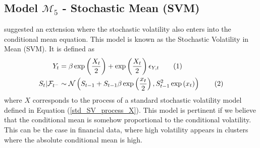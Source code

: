 \documentclass[11pt,a4,twosided,singlespacing,titlepagenumber=on]{scrreprt}
\numberwithin{equation}{chapter} %
\theoremstyle{remark}
\newcommand\numberthis{\addtocounter{equation}{1}\tag{\theequation}}
\begin{document}
\subsection{Model $\mathcal{M}_5$ - Stochastic Mean (SVM)}
\cite{koopman2002} suggested an extension where the stochastic volatility also enters into the conditional mean equation. This model is known as the Stochastic Volatility in Mean (SVM). It is defined as
\begin{align*}
Y_t 			 &= \beta \exp\left(\frac{X_t}{2}\right) + \exp\left(\frac{X_t}{2}\right) \epsilon_{Y,t} \numberthis\\
S_t | \mathcal{F}_{t^-}  &\sim \mathcal{N} \left(S_{t-1} + S_{t-1} \beta \exp\left(\frac{x_t}{2}\right), S_{t-1}^2 \exp\left(x_t\right) \right) \numberthis
\end{align*}
where $X$ corresponds to the process of a standard stochastic volatility model defined in Equation (\ref{std_SV_process_X}). This model is pertinent if we believe that the conditional mean is somehow proportional to the conditional volatility. This can be the case in financial data, where high volatility appears in clusters where the absolute conditional mean is high.
\end{document}
